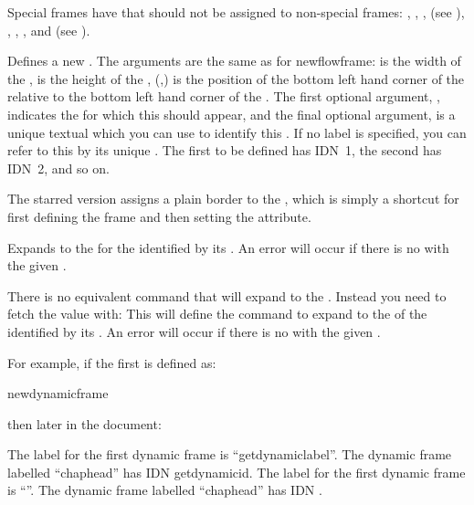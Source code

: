 \documentclass[fontsize=12pt]{scrbook}
\newcommand{\frameoptval}[2]{\optval{frame.#1}{#2}}
\begin{document}
Special frames have  that should not be
assigned to non-special  frames:
, , 
,  (see
), 
, ,
, and 
(see ).

Defines a new . The arguments are the same as for
\gls{newflowframe}:  is the width of 
the ,  is the height of the ,
(,) is the position of the bottom left hand 
corner of the  relative to the bottom left hand 
corner of the . The first optional argument,
, indicates the  for which this
 should appear, and the final optional argument,
 is a unique textual  which you can use to
identify this .  If no label is specified, you
can refer to this  by its unique .
The first  to be defined has \gls*{IDN}~1, the second
has \gls*{IDN}~2, and so on. 

The starred version assigns a plain border to the ,
which is simply a shortcut for first defining the frame and then
setting the \frameoptval{border}{plain} attribute.

Expands to the  for the  identified by its
. An error will occur if there is no  with
the given .

There is no equivalent command that will expand to the .
Instead you need to fetch the value with:
This will define the command  to expand to the  of the
 identified by its . An error will occur if
there is no  with the given .

For example, if the first  is defined as:
\begin{codebox}
\gls{newdynamicframe}\marg{0pt}
\end{codebox}
then later in the document:
\begin{coderesult}[before upper app=\footnotesize]
The label for the first 
dynamic frame is 
``\gls{getdynamiclabel}''.
The dynamic frame labelled 
``chaphead'' has IDN
\gls{getdynamicid}.
\tcblower
The label for the first dynamic frame is
``''.
The dynamic frame labelled ``chaphead'' has IDN
\myid.
\end{coderesult}
\end{document}
